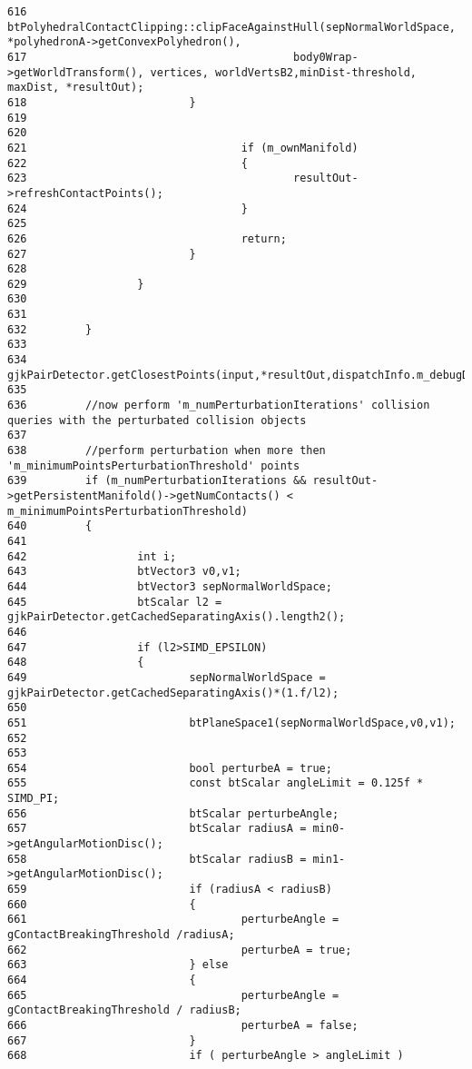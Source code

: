 \begin{Code}
\begin{verbatim}
616                                 btPolyhedralContactClipping::clipFaceAgainstHull(sepNormalWorldSpace, *polyhedronA->getConvexPolyhedron(), 
617                                         body0Wrap->getWorldTransform(), vertices, worldVertsB2,minDist-threshold, maxDist, *resultOut);
618                         }
619                                 
620                                 
621                                 if (m_ownManifold)
622                                 {
623                                         resultOut->refreshContactPoints();
624                                 }
625                                 
626                                 return;
627                         }
628                         
629                 }
630 
631 
632         }
633         
634         gjkPairDetector.getClosestPoints(input,*resultOut,dispatchInfo.m_debugDraw);
635 
636         //now perform 'm_numPerturbationIterations' collision queries with the perturbated collision objects
637         
638         //perform perturbation when more then 'm_minimumPointsPerturbationThreshold' points
639         if (m_numPerturbationIterations && resultOut->getPersistentManifold()->getNumContacts() < m_minimumPointsPerturbationThreshold)
640         {
641                 
642                 int i;
643                 btVector3 v0,v1;
644                 btVector3 sepNormalWorldSpace;
645                 btScalar l2 = gjkPairDetector.getCachedSeparatingAxis().length2();
646         
647                 if (l2>SIMD_EPSILON)
648                 {
649                         sepNormalWorldSpace = gjkPairDetector.getCachedSeparatingAxis()*(1.f/l2);
650                         
651                         btPlaneSpace1(sepNormalWorldSpace,v0,v1);
652 
653 
654                         bool perturbeA = true;
655                         const btScalar angleLimit = 0.125f * SIMD_PI;
656                         btScalar perturbeAngle;
657                         btScalar radiusA = min0->getAngularMotionDisc();
658                         btScalar radiusB = min1->getAngularMotionDisc();
659                         if (radiusA < radiusB)
660                         {
661                                 perturbeAngle = gContactBreakingThreshold /radiusA;
662                                 perturbeA = true;
663                         } else
664                         {
665                                 perturbeAngle = gContactBreakingThreshold / radiusB;
666                                 perturbeA = false;
667                         }
668                         if ( perturbeAngle > angleLimit ) 

\end{verbatim}
\end{Code}
